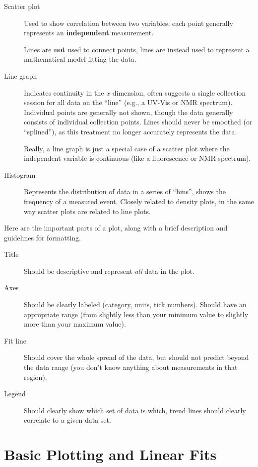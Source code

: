 \documentclass[nobib,nofonts,nols,nohyper]{tufte-handout}
\begin{document}
\begin{description}
	\item[Scatter plot] Used to show correlation between two variables, each point generally represents an \textbf{independent} measurement.

	Lines are \textbf{not} used to connect points, lines are instead used to represent a mathematical model fitting the data.

	\item[Line graph] Indicates continuity in the \( x \) dimension, often suggests a single collection session for all data on the ``line'' (e.g., a UV-Vis or NMR spectrum).
	Individual points are generally not shown, though the data generally consists
  of individual collection points.
	Lines should never be smoothed (or ``splined''), as this treatment no longer accurately represents the data.

	Really, a line graph is just a special case of a scatter plot where the
  independent variable is continuous (like a fluorescence or NMR spectrum).

	\item[Histogram] Represents the distribution of data in a series of ``bins'', shows the frequency of a measured event.
	Closely related to density plots, in the same way scatter plots are related to
  line plots.
\end{description}

Here are the important parts of a plot, along with a brief description and guidelines for formatting.

\begin{description}
	\item[Title] Should be descriptive and represent \emph{all} data in the plot.
	\item[Axes] Should be clearly labeled (category, units, tick numbers).
	Should have an appropriate range (from slightly less than your minimum value to slightly more than your maximum value).
	\item[Fit line] Should cover the whole spread of the data, but should not predict beyond the data range (you don't know anything about measurements in that region).
	\item[Legend] Should clearly show which set of data is which, trend lines should clearly correlate to a given data set.
\end{description}


\section{Basic Plotting and Linear Fits} %
\label{basic-plotting-and-linear-fits}
\end{document}
